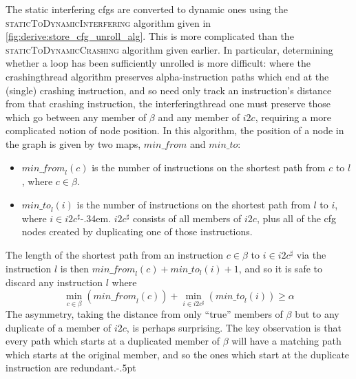 The static interfering \glspl{cfg} are converted to dynamic ones using
the \textsc{staticToDynamicInterfering} algorithm given in
\autoref{fig:derive:store_cfg_unroll_alg}.  This is more complicated
than the \textsc{staticToDynamicCrashing} algorithm given earlier.  In
particular, determining whether a loop has been sufficiently unrolled
is more difficult: where the \gls{crashingthread} algorithm preserves
\gls{alpha}-instruction paths which end at the (single) \gls{crashing
  instruction}, and so need only track an instruction's distance from
that \gls{crashing instruction}, the \gls{interferingthread} one must
preserve those which go between any member of $\beta$ and any member
of $i2c$, requiring a more complicated notion of node position.  In
this algorithm, the position of a node in the graph is given by two
maps, $\mathit{min\_from}$ and $\mathit{min\_to}$:
\begin{itemize}
\item
  $\mathit{min\_from}_l(c)$ is the number of instructions on the
  shortest path from $c$ to $l$, where $c \in \beta$.
\item
  $\mathit{min\_to}_l(i)$ is the number of instructions on the
  shortest path from $l$ to $i$, where $i \in i2c^\sharp$\kern-.34em.
  $i2c^\sharp$ consists of all members of $i2c$, plus all of the
  \gls{cfg} nodes created by duplicating one of those instructions.
\end{itemize}
The length of the shortest path from an instruction $c \in \beta$ to
$i \in i2c^\sharp$ via the instruction $l$ is then
$\mathit{min\_from}_l(c) + \mathit{min\_to}_l(i) + 1$, and so it is
safe to discard any instruction $l$ where
\begin{displaymath}
\min_{c \in \beta}\left(\mathit{min\_from}_l(c)\right) + \min_{i \in i2c^\sharp}\left(\mathit{min\_to}_l(i)\right) {\geq} \alpha
\end{displaymath}
The asymmetry, taking the distance from only ``true'' members of
$\beta$ but to any duplicate of a member of $i2c$, is perhaps
surprising.  The key observation is that every path which starts at a
duplicated member of $\beta$ will have a matching path which starts at
the original member, and so the ones which start at the duplicate
instruction are redundant.\kern-.5pt

